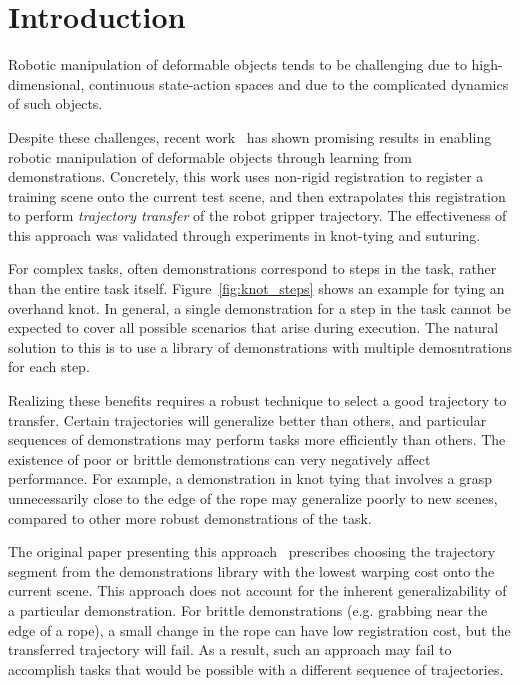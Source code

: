 \section{Introduction}

Robotic manipulation of deformable objects tends to be challenging due to high-dimensional, 
continuous state-action spaces and due to the complicated dynamics of
such objects.

Despite these challenges, recent
work~\cite{Schulmanetal_IROS2013, Schulmanetal_ISRR2013} has shown
promising results in enabling robotic manipulation of deformable
objects through learning from demonstrations.  Concretely, this work
uses non-rigid registration to register a training scene onto the
current test scene, and then extrapolates this registration to perform
\emph{trajectory transfer} of the robot gripper trajectory.  The
effectiveness of this approach was validated through experiments in
knot-tying and suturing.

For complex tasks, often demonstrations correspond to steps in the task, rather
than the entire task itself. Figure~\ref{fig:knot_steps} shows an example
for tying an overhand knot.
In general, a single demonstration for a step in the task cannot be expected
to cover all possible scenarios that arise during execution.
The natural solution to this is to use a library of demonstrations with
multiple demosntrations for each step.

Realizing these benefits requires a robust technique to select a good trajectory to
transfer.  Certain trajectories will generalize better than others, and particular sequences of 
demonstrations may perform tasks more efficiently than others.
The existence of poor or brittle demonstrations can very negatively 
affect performance.
For example, a demonstration in knot tying that involves a grasp
unnecessarily close to the edge of the rope may generalize poorly
to new scenes, compared to other more robust demonstrations of the task.

The original paper presenting this approach~\cite{Schulmanetal_ISRR2013}
prescribes choosing the trajectory segment from the demonstrations
library with the lowest warping cost onto the current scene.
This approach does not account for the inherent generalizability
of a particular demonstration. For brittle demonstrations (e.g. grabbing
near the edge of a rope), a small change in the rope can have low registration
cost, but the transferred trajectory will fail.
As a result, such an approach may fail to accomplish tasks
that would be possible with a different sequence of trajectories.

